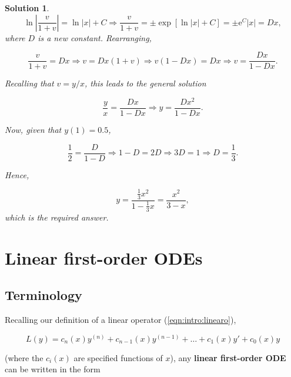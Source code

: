 \documentclass[a4paper]{report}
\newtheorem*{solution}{Solution}
\begin{document}
\begin{solution}
\begin{displaymath}
\ln \left|\frac{v}{1+v}\right| = \ln |x| + C \Longrightarrow \frac{v}{1+v} = \pm\exp\left[\ln|x|+C\right] = \pm \mathrm{e}^C |x| = Dx,
\end{displaymath}
\noindent where $D$ is a new constant. Rearranging,

\begin{displaymath}
\frac{v}{1+v} = Dx \Longrightarrow v = Dx(1+v) \Longrightarrow v(1 - Dx) = Dx \Longrightarrow v = \frac{Dx}{1-Dx}.
\end{displaymath}

\noindent Recalling that $v=y/x$, this leads to the general solution

\begin{displaymath}
\frac{y}{x} = \frac{Dx}{1-Dx} \Longrightarrow y = \frac{Dx^2}{1-Dx}.
\end{displaymath}

\noindent Now, given that $y(1)=0.5$, 

\begin{displaymath}
\frac{1}{2} = \frac{D}{1-D} \Longrightarrow 1-D = 2D \Longrightarrow 3D = 1 \Longrightarrow D= \frac{1}{3}.
\end{displaymath}

\noindent Hence,

\begin{displaymath}
y = \frac{\frac{1}{3}x^2}{1- \frac{1}{3}x} = \frac{x^2}{3-x},
\end{displaymath}
\noindent which is the required answer. 
\end{solution}

\section{Linear first-order ODEs}
\label{sec:first:linear}

\subsection{Terminology}
\label{subsec:first:linearform}
Recalling our definition of a linear operator (\ref{eqn:intro:linearo}), 

\begin{displaymath}
L(y) = c_n(x)y^{(n)} + c_{n-1}(x)y^{(n-1)}+\ldots + c_1(x)y' + c_0(x)y
\end{displaymath}

\noindent (where the $c_i(x)$ are specified functions of $x$), any {\bf linear first-order ODE} can be written in the form
\end{document}
